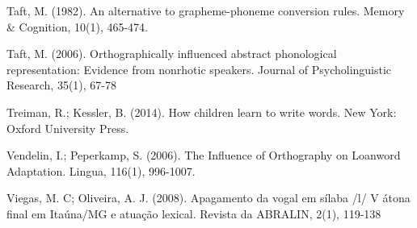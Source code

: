 Taft, M. (1982). An alternative to grapheme-phoneme conversion rules. Memory \& Cognition, 10(1), 465-474.

Taft, M. (2006). Orthographically influenced abstract phonological representation: Evidence from nonrhotic speakers. Journal of Psycholinguistic Research, 35(1), 67-78

Treiman, R.; Kessler, B. (2014). How children learn to write words. New York: Oxford University Press.

Vendelin, I.; Peperkamp, S. (2006). The Influence of Orthography on Loanword Adaptation. Lingua, 116(1), 996-1007.

Viegas, M. C; Oliveira, A. J. (2008). Apagamento da vogal em sílaba /l/ V átona final em Itaúna/MG e atuação lexical. Revista da ABRALIN, 2(1), 119-138





